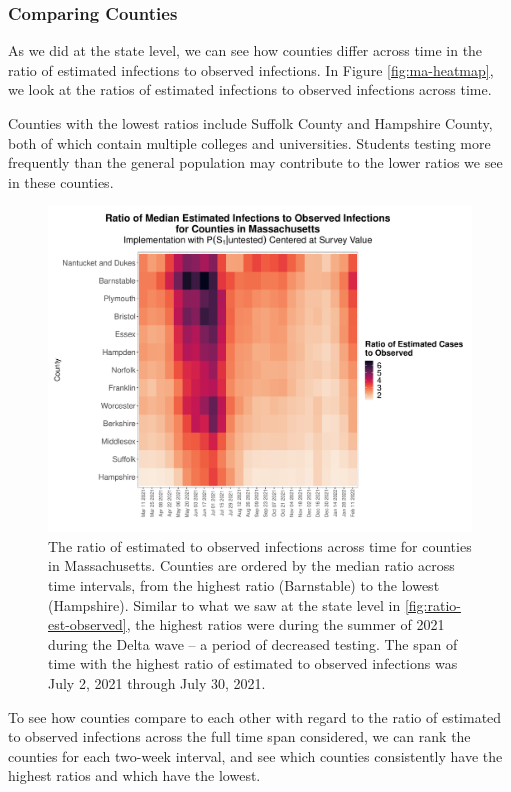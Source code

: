 \documentclass[12pt,twoside]{smiththesis}
\begin{document}
\hypertarget{comparing-counties}{%
\subsubsection{Comparing Counties}\label{comparing-counties}}

As we did at the state level, we can see how counties differ across time in the ratio of estimated infections to observed infections. In Figure \ref{fig:ma-heatmap}, we look at the ratios of estimated infections to observed infections across time.

Counties with the lowest ratios include Suffolk County and Hampshire County, both of which contain multiple colleges and universities. Students testing more frequently than the general population may contribute to the lower ratios we see in these counties.
\begin{figure}
\includegraphics[width=1\linewidth]{figure/ma_county_heatmap_ratio_est_observed} \caption{\label{fig:ma-heatmap} The ratio of estimated to observed infections across time for counties in Massachusetts. Counties are ordered by the median ratio across time intervals, from the highest ratio (Barnstable) to the lowest (Hampshire). Similar to what we saw at the state level in \ref{fig:ratio-est-observed}, the highest ratios were during the summer of 2021 during the Delta wave -- a period of decreased testing. The span of time with the highest ratio of estimated to observed infections was July 2, 2021 through July 30, 2021.}\label{fig:unnamed-chunk-81}
\end{figure}
To see how counties compare to each other with regard to the ratio of estimated to observed infections across the full time span considered, we can rank the counties for each two-week interval, and see which counties consistently have the highest ratios and which have the lowest.
\end{document}
